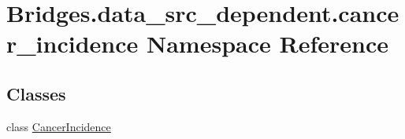 \hypertarget{namespace_bridges_1_1data__src__dependent_1_1cancer__incidence}{}\section{Bridges.\+data\+\_\+src\+\_\+dependent.\+cancer\+\_\+incidence Namespace Reference}
\label{namespace_bridges_1_1data__src__dependent_1_1cancer__incidence}
\subsection*{Classes}
\begin{DoxyCompactItemize}
\item 
class \hyperlink{class_bridges_1_1data__src__dependent_1_1cancer__incidence_1_1_cancer_incidence}{Cancer\+Incidence}
\end{DoxyCompactItemize}
